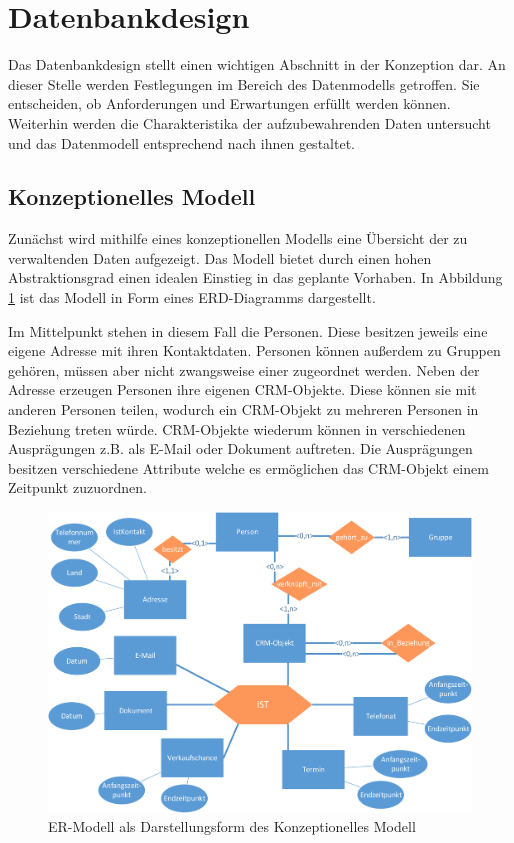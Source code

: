 \section{Datenbankdesign}

Das Datenbankdesign stellt einen wichtigen Abschnitt in der Konzeption dar. An dieser Stelle werden Festlegungen im Bereich des Datenmodells getroffen. Sie entscheiden, ob Anforderungen und Erwartungen erfüllt werden können. Weiterhin werden die Charakteristika der aufzubewahrenden Daten untersucht und das Datenmodell entsprechend nach ihnen gestaltet.

\subsection{Konzeptionelles Modell}

Zunächst wird mithilfe eines konzeptionellen Modells eine Übersicht der zu verwaltenden Daten aufgezeigt. Das Modell bietet durch einen hohen Abstraktionsgrad einen idealen Einstieg in das geplante Vorhaben. In Abbildung \ref{konzept_erd} ist das Modell in Form eines ERD-Diagramms dargestellt. 

Im Mittelpunkt stehen in diesem Fall die Personen. Diese besitzen jeweils eine eigene Adresse mit ihren Kontaktdaten. Personen können außerdem zu Gruppen gehören, müssen aber nicht zwangsweise einer zugeordnet werden. Neben der Adresse erzeugen Personen ihre eigenen CRM-Objekte. Diese können sie mit anderen Personen teilen, wodurch ein CRM-Objekt zu mehreren Personen in Beziehung treten würde. CRM-Objekte wiederum können in verschiedenen Ausprägungen z.B. als E-Mail oder Dokument auftreten. Die Ausprägungen besitzen verschiedene Attribute welche es ermöglichen das CRM-Objekt einem Zeitpunkt zuzuordnen.

\begin{figure}[htbp]
\centering
  \includegraphics[width=1.0\textwidth, width=1.0\textwidth]{pics/konzept_erd.pdf}
\caption{ER-Modell als Darstellungsform des Konzeptionelles Modell}
\label{konzept_erd}
\end{figure} 

